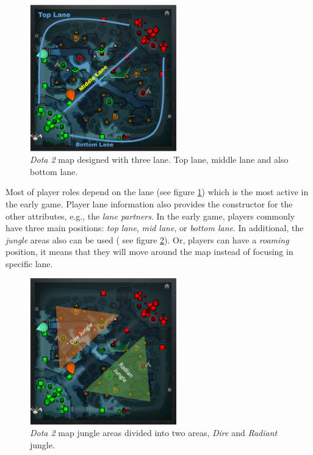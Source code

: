 \begin{figure}
\centering
\includegraphics[width=2.5in]{./figures/lane_map.png}
\caption{\textit{Dota 2} map designed with three lane. Top lane, middle lane and also bottom lane.}
\label{fig:map_lane}
\end{figure}

Most of player roles depend on the lane (see figure \ref{fig:map_lane}) which is the most active in the early game. Player lane information also provides the constructor for the other attributes, e.g., the \textit{lane partners}. In the early game, players commonly have three main positions: \textit{top lane}, \textit{mid lane}, or \textit{bottom lane}. In additional, the \textit{jungle} areas also can be used ( see figure \ref{fig:map_jungle}). Or, players can have a \textit{roaming} position, it means that they will move around the map instead of focusing in specific lane.

\begin{figure}
\centering
\includegraphics[width=2.5in]{./figures/map_jungle.png}
\caption{\textit{Dota 2} map jungle areas divided into two areas, \textit{Dire} and \textit{Radiant} jungle.}
\label{fig:map_jungle}
\end{figure}

